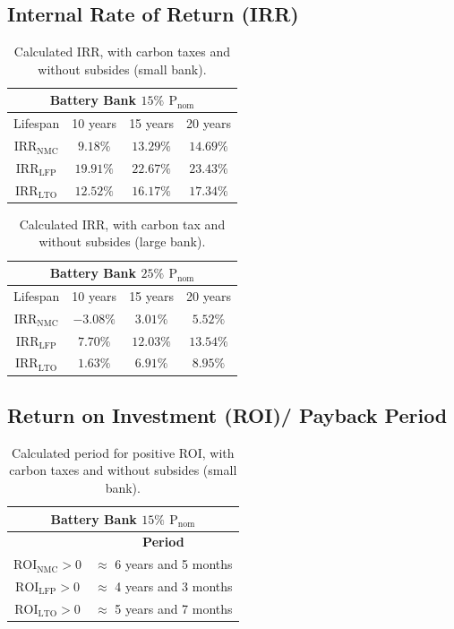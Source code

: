\subsection{Internal Rate of Return (IRR)}

\begin{table}[H]
	\centering
	\caption{Calculated IRR, with carbon taxes and without subsides (small bank).}
	\label{tab:tir1c}
	\begin{tabular}{|c|c|c|c|}
		\hline
		\multicolumn{4}{|c|}{Battery Bank $15\%$ ${\text{P}}_{\text{nom}}$} \\
		\hline\hline
	Lifespan  & 10 years & 15 years & 20 years\\
		 \hline
    ${\text{IRR}}_{\text{NMC}}$ & $9.18\%$ & $13.29\%$ & $14.69\%$ \\
		 \hline
	${\text{IRR}}_{\text{LFP}}$ & $19.91\%$ & $22.67\%$ & $23.43\%$\\
		 \hline
 	${\text{IRR}}_{\text{LTO}}$ & $12.52\%$ & $16.17\%$ & $17.34\%$\\
		 \hline
	\end{tabular}
\end{table}

\begin{table}[H]
	\centering
	\caption{Calculated IRR, with carbon tax and without subsides (large bank).}
	\label{tab:tir2c}
	\begin{tabular}{|c|c|c|c|}
		\hline
		\multicolumn{4}{|c|}{Battery Bank $25\%$ ${\text{P}}_{\text{nom}}$} \\
		\hline\hline
	Lifespan  & 10 years & 15 years & 20 years\\
		 \hline
    ${\text{IRR}}_{\text{NMC}}$ & $-3.08\%$ & $3.01\%$ & $5.52\%$ \\
		 \hline
	${\text{IRR}}_{\text{LFP}}$ & $7.70\%$ & $12.03\%$ & $13.54\%$\\
		 \hline
 	${\text{IRR}}_{\text{LTO}}$ & $1.63\%$ & $6.91\%$ & $8.95\%$\\
		 \hline
	\end{tabular}
\end{table}

\subsection{Return on Investment (ROI)/ Payback Period}

\begin{table}[H]
	\centering
	\caption{Calculated period for positive ROI, with carbon taxes and without subsides (small bank).}
	\label{tab:roi1c}
	\begin{tabular}{|c|c|}
		\hline
		\multicolumn{2}{|c|}{Battery Bank $15\%$ ${\text{P}}_{\text{nom}}$} \\
		\hline\hline
		    & \textbf{Period}\\
		 \hline
	${\text{ROI}}_{\text{NMC}}>0$ & $\approx$ 6 years and 5 months\\
		 \hline
	${\text{ROI}}_{\text{LFP}}>0$ & $\approx$ 4 years and 3 months\\
		 \hline
 	${\text{ROI}}_{\text{LTO}}>0$ & $\approx$ 5 years and 7 months\\
		 \hline
	\end{tabular}
\end{table}

